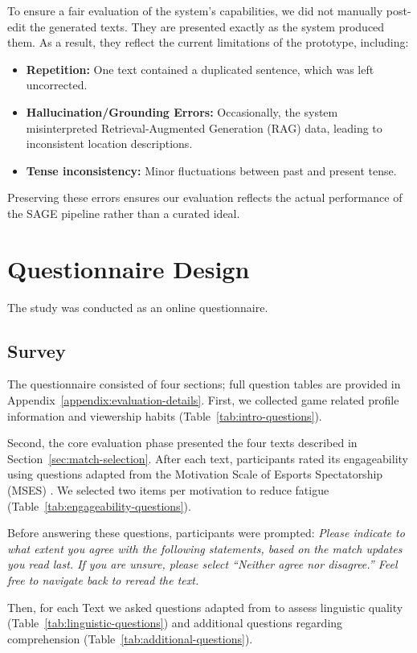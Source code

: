 To ensure a fair evaluation of the system's capabilities, we did not manually post-edit the generated texts. They are presented exactly as the system produced them. As a result, they reflect the current limitations of the prototype, including:
\begin{itemize}[noitemsep,topsep=0pt]
  \item \textbf{Repetition:} One text contained a duplicated sentence, which was left uncorrected.
  \item \textbf{Hallucination/Grounding Errors:} Occasionally, the system misinterpreted Retrieval-Augmented Generation (RAG) data, leading to inconsistent location descriptions.
  \item \textbf{Tense inconsistency:} Minor fluctuations between past and present tense.
\end{itemize}
Preserving these errors ensures our evaluation reflects the actual performance of the SAGE pipeline rather than a curated ideal.

\section{Questionnaire Design}
The study was conducted as an online questionnaire.

\subsection{Survey}
The questionnaire consisted of four sections; full question tables are provided in Appendix~\ref{appendix:evaluation-details}. First, we collected game related profile information and viewership habits (Table~\ref{tab:intro-questions}).

Second, the core evaluation phase presented the four texts described in Section~\ref{sec:match-selection}. After each text, participants rated its engageability using questions adapted from the Motivation Scale of Esports Spectatorship (MSES) \cite{qian2020}. We selected two items per motivation to reduce fatigue (Table~\ref{tab:engageability-questions}).

Before answering these questions, participants were prompted: \textit{Please indicate to what extent you agree with the following statements, based on the match updates you read last. If you are unsure, please select ``Neither agree nor disagree.'' Feel free to navigate back to reread the text.}

Then, for each Text we asked questions adapted from \cite{callaway2002} to assess linguistic quality (Table~\ref{tab:linguistic-questions}) and additional questions regarding comprehension (Table~\ref{tab:additional-questions}).

